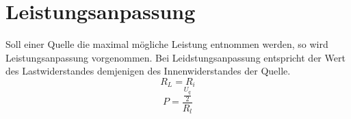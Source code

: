 



\section{Leistungsanpassung}
Soll einer Quelle die maximal mögliche Leistung entnommen werden, so wird Leistungsanpassung vorgenommen. 
Bei Leidstungsanpassung entspricht der Wert des Lastwiderstandes demjenigen des Innenwiderstandes der Quelle. 
\[ R_L = R_i \]
\[ P = \frac{\frac{U_q}{2}}{R_l} \]